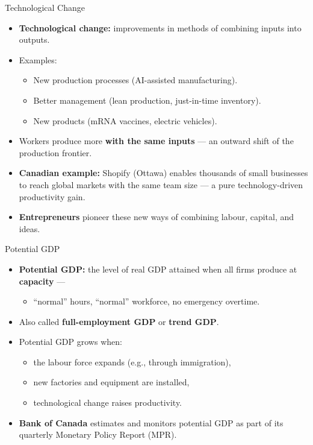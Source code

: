 \documentclass[aspectratio=169]{beamer}
\begin{document}
\begin{frame}{Technological Change}
\transfade
\begin{itemize}[<+->]
  \item \textbf{Technological change:} improvements in methods of combining inputs into outputs.
  \item Examples:
  \begin{itemize}[<+->]
    \item New production processes (AI-assisted manufacturing).
    \item Better management (lean production, just-in-time inventory).
    \item New products (mRNA vaccines, electric vehicles).
  \end{itemize}
  \item Workers produce more \textbf{with the same inputs} --- an outward shift of the production frontier.
  \item \textbf{Canadian example:} Shopify (Ottawa) enables thousands of small businesses to reach global markets with the same team size --- a pure technology-driven productivity gain.
  \item \textbf{Entrepreneurs} pioneer these new ways of combining labour, capital, and ideas.
\end{itemize}
\end{frame}


\begin{frame}{Potential GDP}
\transfade
\begin{itemize}[<+->]
  \item \textbf{Potential GDP:} the level of real GDP attained when all firms produce at \textbf{capacity} ---
  \begin{itemize}[<+->]
    \item ``normal'' hours, ``normal'' workforce, no emergency overtime.
  \end{itemize}
  \item Also called \textbf{full-employment GDP} or \textbf{trend GDP}.
  \item Potential GDP grows when:
  \begin{itemize}[<+->]
    \item the labour force expands (e.g., through immigration),
    \item new factories and equipment are installed,
    \item technological change raises productivity.
  \end{itemize}
  \item \textbf{Bank of Canada} estimates and monitors potential GDP as part of its quarterly Monetary Policy Report (MPR).
\end{itemize}
\end{frame}
\end{document}
